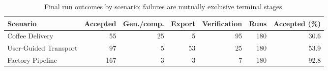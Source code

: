 \begin{table}
\caption{Final run outcomes by scenario; failures are mutually exclusive terminal stages.}
\label{tab:final-outcomes}
\begin{tabular}{lrrrrrr}
\toprule
Scenario & Accepted & Gen./comp. & Export & Verification & Runs & Accepted (\%) \\
\midrule
Coffee Delivery & 55 & 25 & 5 & 95 & 180 & 30.6 \\
User-Guided Transport & 97 & 5 & 53 & 25 & 180 & 53.9 \\
Factory Pipeline & 167 & 3 & 3 & 7 & 180 & 92.8 \\
\bottomrule
\end{tabular}
\end{table}
